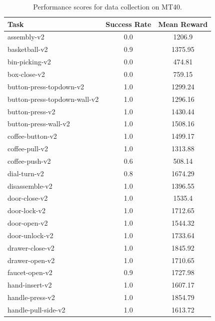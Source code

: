 \begin{table}[]
    \centering
    \caption{Performance scores for data collection on MT40.}
    \begin{tabular}{l c c}
    \toprule
                            \textbf{Task} & \textbf{Success Rate} &      \textbf{Mean Reward} \\
    \midrule
                     assembly-v2 &    0.0 &     1206.9  \\
                   basketball-v2 &    0.9 &    1375.95  \\
                  bin-picking-v2 &    0.0 &     474.81  \\
                    box-close-v2 &    0.0 &     759.15  \\
         button-press-topdown-v2 &    1.0 &    1299.24  \\
    button-press-topdown-wall-v2 &    1.0 &    1296.16  \\
                 button-press-v2 &    1.0 &    1430.44  \\
            button-press-wall-v2 &    1.0 &    1508.16  \\
                coffee-button-v2 &    1.0 &    1499.17  \\
                  coffee-pull-v2 &    1.0 &    1313.88  \\
                  coffee-push-v2 &    0.6 &     508.14  \\
                    dial-turn-v2 &    0.8 &    1674.29  \\
                  disassemble-v2 &    1.0 &    1396.55  \\
                   door-close-v2 &    1.0 &     1535.4  \\
                    door-lock-v2 &    1.0 &    1712.65  \\
                    door-open-v2 &    1.0 &    1544.32  \\
                  door-unlock-v2 &    1.0 &    1733.64  \\
                 drawer-close-v2 &    1.0 &    1845.92  \\
                  drawer-open-v2 &    1.0 &    1710.65  \\
                  faucet-open-v2 &    0.9 &    1727.98  \\
                  hand-insert-v2 &    1.0 &    1607.17  \\
                 handle-press-v2 &    1.0 &    1854.79  \\
             handle-pull-side-v2 &    1.0 &    1613.72  \\

\end{tabular}
\end{table}
